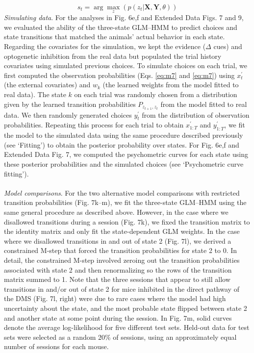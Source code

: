 \begin{equation}
\label{eq:m19}
s_t = \arg \mathop {{\max }}\limits_z \left( {p\left( {z_t|{{{\mathbf{X}}}},{{{\mathbf{Y}}}},\theta } \right)} \right)
\end{equation} 
\textit{Simulating data}.
For the analyses in Fig. 6e,f and Extended Data Figs. 7 and 9, we evaluated the ability of the three-state GLM–HMM to predict choices and state transitions that matched the animals’ actual behavior in each state. Regarding the covariates for the simulation, we kept the evidence ($\Delta$ cues) and optogenetic inhibition from the real data but populated the trial history covariates using simulated previous choices. To simulate choices on each trial, we first computed the observation probabilities (Eqs. \ref{eq:m7} and \ref{eq:m7}) using $x_t^\prime$ (the external covariates) and $w_k$ (the learned weights from the model fitted to real data). The state $k$ on each trial was randomly chosen from a distribution given by the learned transition probabilities $P_{z_{t + 1},z_t}$ from the model fitted to real data. We then randomly generated choices $y_t^\prime$ from the distribution of observation probabilities. Repeating this process for each trial to obtain $x_{1:T}^\prime$ and $y_{1:T}^\prime$, we fit the model to the simulated data using the same procedure described previously (see ‘Fitting’) to obtain the posterior probability over states. For Fig. 6e,f and Extended Data Fig. 7, we computed the psychometric curves for each state using these posterior probabilities and the simulated choices (see ‘Psychometric curve fitting’). \\\\
\textit{Model comparisons}. For the two alternative model comparisons with restricted transition probabilities (Fig. 7k–m), we fit the three-state GLM–HMM using the same general procedure as described above. However, in the case where we disallowed transitions during a session (Fig. 7k), we fixed the transition matrix to the identity matrix and only fit the state-dependent GLM weights. In the case where we disallowed transitions in and out of state 2 (Fig. 7l), we derived a constrained M-step that forced the transition probabilities for state 2 to 0. In detail, the constrained M-step involved zeroing out the transition probabilities associated with state 2 and then renormalizing so the rows of the transition matrix summed to 1. Note that the three sessions that appear to still allow transitions in and/or out of state 2 for mice inhibited in the direct pathway of the DMS (Fig. 7l, right) were due to rare cases where the model had high uncertainty about the state, and the most probable state flipped between state 2 and another state at some point during the session. In Fig. 7m, solid curves denote the average log-likelihood for five different test sets. Held-out data for test sets were selected as a random 20\% of sessions, using an approximately equal number of sessions for each mouse.